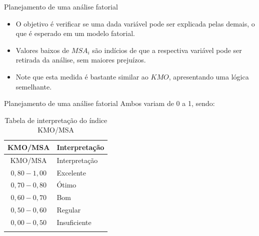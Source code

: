 \documentclass[
  ignorenonframetext,
  aspectratio=169,
]{beamer}
\providecommand{\tightlist}{%
  \setlength{\itemsep}{0pt}\setlength{\parskip}{0pt}}
\begin{document}
\begin{frame}{Planejamento de uma análise fatorial}
\label{planejamento-de-uma-anuxe1lise-fatorial-9}
\begin{itemize}
\tightlist
\item
  O objetivo é verificar se uma dada variável pode ser explicada pelas
  demais, o que é esperado em um modelo fatorial.
\end{itemize}

\pause

\begin{itemize}
\tightlist
\item
  Valores baixos de \(MSA_i\) são indícios de que a respectiva variável
  pode ser retirada da análise, sem maiores prejuízos.
\end{itemize}

\pause

\begin{itemize}
\tightlist
\item
  Note que esta medida é bastante similar ao \(KMO\), apresentando uma
  lógica semelhante.
\end{itemize}
\end{frame}

\begin{frame}{Planejamento de uma análise fatorial}
\label{planejamento-de-uma-anuxe1lise-fatorial-10}
Ambos variam de 0 a 1, sendo:

\begin{longtable}[]{@{}cl@{}}
\caption{Tabela de interpretação do índice
KMO/MSA}\label{tbl-kmo}\tabularnewline
\toprule\noalign{}
KMO/MSA & Interpretação \\
\midrule\noalign{}
\endfirsthead
\toprule\noalign{}
KMO/MSA & Interpretação \\
\midrule\noalign{}
\endhead
\(0,80 - 1,00\) & Excelente \\
\(0,70 - 0,80\) & Ótimo \\
\(0,60 - 0,70\) & Bom \\
\(0,50 - 0,60\) & Regular \\
\(0,00 - 0,50\) & Insuficiente \\
\bottomrule\noalign{}
\end{longtable}
\end{frame}
\end{document}
